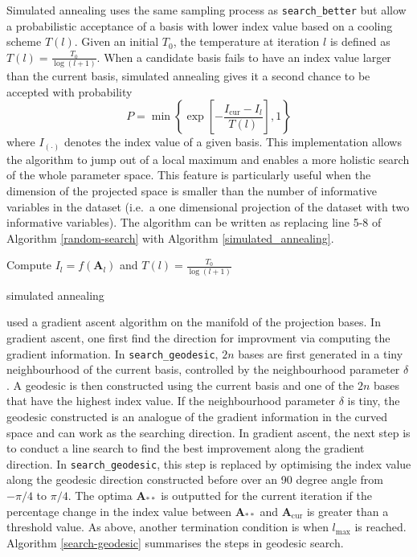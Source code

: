 \documentclass[12pt]{article}
\begin{document}
Simulated annealing \citep[\citet{bertsimas1993simulated}]{kirkpatrick1983optimization} uses the same sampling process as \texttt{search\_better} but allow a probabilistic acceptance of a basis with lower index value based on a cooling scheme \(T(l)\). Given an initial \(T_0\), the temperature at iteration \(l\) is defined as \(T(l) = \frac{T_0}{\log(l + 1)}\). When a candidate basis fails to have an index value larger than the current basis, simulated annealing gives it a second chance to be accepted with probability \[P= \min\left\{\exp\left[-\frac{I_{\text{cur}} - I_{l}}{T(l)}\right],1\right\}\] where \(I_{(\cdot)}\) denotes the index value of a given basis. This implementation allows the algorithm to jump out of a local maximum and enables a more holistic search of the whole parameter space. This feature is particularly useful when the dimension of the projected space is smaller than the number of informative variables in the dataset (i.e.~a one dimensional projection of the dataset with two informative variables). The algorithm can be written as replacing line 5-8 of Algorithm \ref{random-search} with Algorithm \ref{simulated_annealing}.

\begin{algorithm}
\SetAlgoLined
    Compute $I_{l} = f(\mathbf{A}_{l})$ and $T(l) = \frac{T_0}{\log(l + 1)}$\;
  \caption{simulated annealing}
  \label{simulated_annealing}
\end{algorithm}

\citet{cook1995grand} used a gradient ascent algorithm on the manifold of the projection bases. In gradient ascent, one first find the direction for improvment via computing the gradient information. In \texttt{search\_geodesic}, \(2n\) bases are first generated in a tiny neighbourhood of the current basis, controlled by the neighbourhood parameter \(\delta\). A geodesic is then constructed using the current basis and one of the \(2n\) bases that have the highest index value. If the neighbourhood parameter \(\delta\) is tiny, the geodesic constructed is an analogue of the gradient information in the curved space and can work as the searching direction. In gradient ascent, the next step is to conduct a line search to find the best improvement along the gradient direction. In \texttt{search\_geodesic}, this step is replaced by optimising the index value along the geodesic direction constructed before over an 90 degree angle from \(-\pi/4\) to \(\pi/4\). The optima \(\mathbf{A}_{**}\) is outputted for the current iteration if the percentage change in the index value between \(\mathbf{A}_{**}\) and \(\mathbf{A}_{\text{cur}}\) is greater than a threshold value. As above, another termination condition is when \(l_{\max}\) is reached. Algorithm \ref{search-geodesic} summarises the steps in geodesic search.
\end{document}
